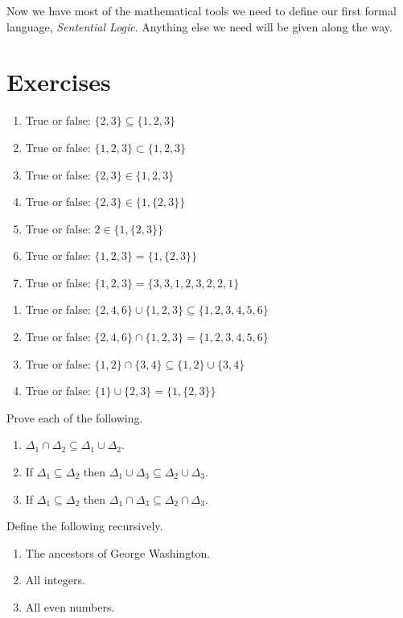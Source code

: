 Now we have most of the mathematical tools we need to define our first formal language, \emph{Sentential Logic}. Anything else we need will be given along the way.

\section{Exercises}


\begin{enumerate}
	\item True or false: $\{2, 3\}\subseteq\{1, 2, 3\}$
    \item True or false: $\{1, 2, 3\}\subset\{1, 2, 3\}$
	\item True or false: $\{2, 3\}\in\{1, 2, 3\}$
    \item True or false: $\{2, 3\}\in\{1, \{2, 3\}\}$
    \item True or false: $2\in\{1, \{2, 3\}\}$
    \item True or false: $\{1, 2, 3\}=\{1, \{2, 3\}\}$
    \item True or false: $\{1, 2, 3\}=\{3, 3, 1, 2, 3, 2, 2, 1\}$
\end{enumerate}


\begin{enumerate}
	\item True or false: $\{2,4,6\}\cup\{1,2,3\}\subseteq\{1,2,3,4,5,6\}$
	\item True or false: $\{2,4,6\}\cap\{1,2,3\}=\{1,2,3,4,5,6\}$
    \item True or false: $\{1,2\}\cap\{3,4\}\subseteq\{1,2\}\cup\{3,4\}$
	\item True or false: $\{1\}\cup\{2, 3\}=\{1, \{2, 3\}\}$
\end{enumerate}

Prove each of the following.
\begin{enumerate}
	\item $\Delta_1\cap\Delta_2\subseteq\Delta_1\cup\Delta_2$.
	\item If $\Delta_1\subseteq\Delta_2$ then $\Delta_1\cup\Delta_3\subseteq\Delta_2\cup\Delta_3$.
    \item If $\Delta_1\subseteq\Delta_2$ then $\Delta_1\cap\Delta_3\subseteq\Delta_2\cap\Delta_3$.
\end{enumerate}

Define the following recursively.
\begin{enumerate}
	\item The ancestors of George Washington.
	\item All integers.
    \item All even numbers.
\end{enumerate}


